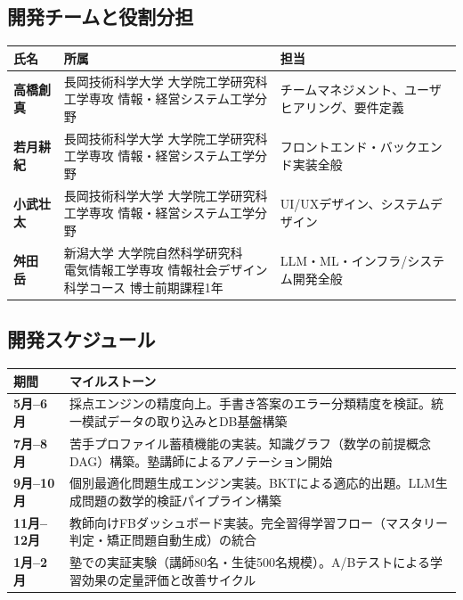 \documentclass[paper=a4,fontsize=10.5bp,jafontsize=10.5bp,twocolumn]{jlreq}
\begin{document}
\subsection{開発チームと役割分担}

\begin{scriptsize}\noindent
\begin{tabularx}{\linewidth}{>{\bfseries}l l X}
\toprule
氏名 & 所属 & 担当 \\
\midrule
高橋創真 & \parbox[t]{3.2cm}{長岡技術科学大学 大学院工学研究科\\工学専攻 情報・経営システム工学分野} & チームマネジメント、ユーザヒアリング、要件定義 \\[4pt]
若月耕紀 & \parbox[t]{3.2cm}{長岡技術科学大学 大学院工学研究科\\工学専攻 情報・経営システム工学分野} & フロントエンド・バックエンド実装全般 \\[4pt]
小武壮太 & \parbox[t]{3.2cm}{長岡技術科学大学 大学院工学研究科\\工学専攻 情報・経営システム工学分野} & UI/UXデザイン、システムデザイン \\[4pt]
舛田　岳 & \parbox[t]{3.2cm}{新潟大学 大学院自然科学研究科\\電気情報工学専攻 情報社会デザイン科学コース 博士前期課程1年} & LLM・ML・インフラ/システム開発全般 \\
\bottomrule
\end{tabularx}
\end{scriptsize}

\subsection{開発スケジュール}

\begin{scriptsize}\noindent
\begin{tabularx}{\linewidth}{>{\bfseries}l X}
\toprule
期間 & マイルストーン \\
\midrule
5月--6月 & 採点エンジンの精度向上。手書き答案のエラー分類精度を検証。統一模試データの取り込みとDB基盤構築 \\
7月--8月 & 苦手プロファイル蓄積機能の実装。知識グラフ（数学の前提概念DAG）構築。塾講師によるアノテーション開始 \\
9月--10月 & 個別最適化問題生成エンジン実装。BKTによる適応的出題。LLM生成問題の数学的検証パイプライン構築 \\
11月--12月 & 教師向けFBダッシュボード実装。完全習得学習フロー（マスタリー判定・矯正問題自動生成）の統合 \\
1月--2月 & 塾での実証実験（講師80名・生徒500名規模）。A/Bテストによる学習効果の定量評価と改善サイクル \\
\bottomrule
\end{tabularx}
\end{scriptsize}
\end{document}
